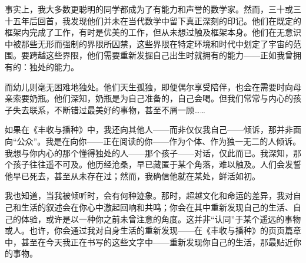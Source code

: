 事实上，我大多数更聪明的同学都成为了有能力和声誉的数学家。然而，三十或三十五年后回首，我发现他们并未在当代数学中留下真正深刻的印记。他们在既定的框架内完成了工作，有时是优美的工作，但从未想过触及框架本身。他们在无意识中被那些无形而强制的界限所囚禁，这些界限在特定环境和时代中划定了宇宙的范围。要跨越这些界限，他们需要重新发掘自己出生时就拥有的能力——正如我曾拥有的：独处的能力。

而幼儿则毫无困难地独处。他们天生孤独，即便偶尔享受陪伴，也会在需要时向母亲索要奶瓶。他们深知，奶瓶是为自己准备的，自己会喝。但我们常常与内心的孩子失去联系，不断错过最美好的事物，甚至不屑一顾……

如果在《丰收与播种》中，我还向其他人——而非仅仅我自己——倾诉，那并非面向“公众”。我是在向你——正在阅读的你——作为个体、作为独一无二的人倾诉。我想与你内心的那个懂得独处的人——那个孩子——对话，仅此而已。我深知，那个孩子往往遥不可及。他历经沧桑，早已藏匿于某个角落，难以触及。人们会发誓他早已死去，甚至从未存在过；然而，我确信他就在某处，鲜活如初。

我也知道，当我被倾听时，会有何种迹象。那时，超越文化和命运的差异，我对自己和生活的叙述会在你心中激起回响和共鸣；你会在其中重新发现自己的生活、自己的体验，或许是以一种你之前未曾注意的角度。这并非“认同”于某个遥远的事物或人。也许，你会通过我对自身生活的重新发现——在《丰收与播种》的页页篇章中，甚至在今天我正在书写的这些文字中——重新发现你自己的生活，那最贴近你的事物。